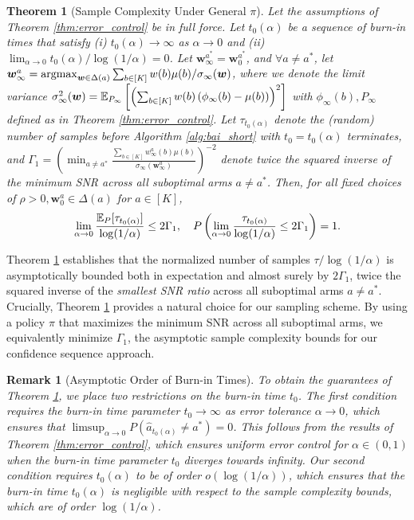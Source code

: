 \documentclass{article}
\newtheorem{theorem}{Theorem}
\newtheorem{remark}{Remark}
\begin{document}
\begin{theorem}[Sample Complexity Under General $\pi$]\label{thm:sample_complexity_general}
Let the assumptions of Theorem \ref{thm:error_control} be in full force. Let $t_0(\alpha)$ be a sequence of burn-in times that satisfy (i) $t_0(\alpha) \rightarrow \infty$ as $\alpha \rightarrow 0$ and (ii) $\lim_{\alpha \rightarrow 0} t_0(\alpha)/\log(1/\alpha) = 0$. Let $\bm{w}_\infty^{a^*}= \bm{w}_0^{a^*}$, and $\forall a \neq a^*$, let $\bm{w}_\infty^a = \argmax_{\bm{w} \in \Delta(a)}\sum_{b \in [K]} {w}(b)\mu(b)/\sigma_\infty(\bm{w})$, where we denote the limit variance $\sigma^2_\infty(\boldsymbol{w}) = \mathbb{E}_{P_\infty}\left[ \left(\sum_{b \in [K]} w(b)\left(\phi_\infty(b) - \mu(b)\right) \right)^2\right]$ with $\phi_\infty(b), P_\infty$ defined as in Theorem \ref{thm:error_control}. Let $\tau_{t_0(\alpha)}$ denote the (random) number of samples before Algorithm \ref{alg:bai_short} with $t_0 = t_0(\alpha)$ terminates, and $\Gamma_1 = \left(\min_{a \neq a^*}\frac{\sum_{b \in [K]} w_\infty^a(b)\mu(b)}{\sigma_\infty(\bm{w}_\infty^a)}\right)^{-2}$ denote twice the squared inverse of the minimum SNR across all suboptimal arms $a \neq a^*$. Then, for all fixed choices of $\rho >0, \bm{w}_0^a \in \Delta(a)$ for $a \in [K]$, 
\begin{equation}
    \lim_{\alpha \rightarrow 0}\frac{\mathbb{E}_P[\tau_{t_0(\alpha)}]}{\log(1/\alpha)} \leq 2\Gamma_1, \quad P\left(\lim_{\alpha \rightarrow 0} \frac{\tau_{t_0(\alpha)}}{\log(1/\alpha)} \leq 2\Gamma_1\right) = 1.
\end{equation} 
\end{theorem}

Theorem \ref{thm:sample_complexity_general} establishes that the normalized number of samples $\tau/\log(1/\alpha)$ is asymptotically bounded both in expectation and almost surely by $2\Gamma_1$, twice the squared inverse of the \textit{smallest SNR ratio} across all suboptimal arms $a \neq a^*$. Crucially, Theorem \ref{thm:sample_complexity_general} provides a natural choice for our sampling scheme. By using a policy $\pi$ that maximizes the minimum SNR across all suboptimal arms, we equivalently minimize $\Gamma_1$, the asymptotic sample complexity bounds for our confidence sequence approach.


\begin{remark}[Asymptotic Order of Burn-in Times]
    To obtain the guarantees of Theorem \ref{thm:sample_complexity_general}, we place two restrictions on the burn-in time $t_0$. The first condition requires the burn-in time parameter $t_0 \rightarrow \infty$ as error tolerance $\alpha \rightarrow 0$, which ensures that $\limsup_{\alpha \rightarrow 0} P\left(\hat{a}_{t_0(\alpha)} \neq a^* \right) = 0$. This follows from the results of Theorem \ref{thm:error_control}, which ensures uniform error control for $\alpha \in (0,1)$ when the burn-in time parameter $t_0$ diverges towards infinity. Our second condition requires $t_0(\alpha)$ to be of order $o\left(\log(1/\alpha)\right)$, which ensures that the burn-in time $t_0(\alpha)$ is negligible with respect to the sample complexity bounds, which are of order $\log(1/\alpha)$. 
\end{remark}
\end{document}

